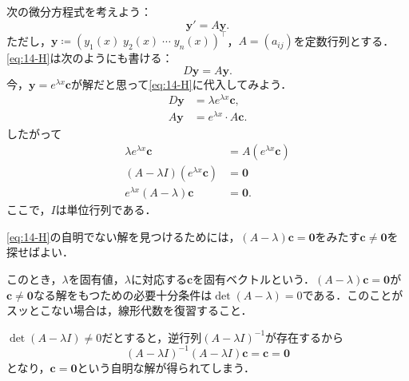 次の微分方程式を考えよう：
\begin{equation}
    \bm{y}' = A\bm{y}. \label{eq:14-H}
\end{equation}
ただし，$\bm{y} \coloneqq (y_1(x) \; y_2(x) \; \cdots \; y_n(x))^\top$，$A=(a_{ij})$を定数行列とする．\eqref{eq:14-H}は次のようにも書ける：
\begin{equation}
    D\bm{y} = A\bm{y}.
\end{equation}
今，$\bm{y}=e^{\lambda x}\bm{c}$が解だと思って\eqref{eq:14-H}に代入してみよう．
\begin{align*}
    D\bm{y} &= \lambda e^{\lambda x} \bm{c}, \\
    A\bm{y} &= e^{\lambda x} \cdot A\bm{c}.
\end{align*}
したがって
\begin{align*}
    \lambda e^{\lambda x} \bm{c} &= A(e^{\lambda x} \bm{c}) \\
    (A-\lambda I)(e^{\lambda x}\bm{c}) &= \bm{0} \\
    e^{\lambda x}(A-\lambda)\bm{c} &= \bm{0}.
\end{align*}
ここで，$I$は単位行列である．
\begin{remark}
    \eqref{eq:14-H}の自明でない解を見つけるためには，$(A-\lambda)\bm{c} = \bm{0}$をみたす$\bm{c} \neq \bm{0}$を探せばよい．
\end{remark}
このとき，$\lambda$を固有値，$\lambda$に対応する$\bm{c}$を固有ベクトルという．$(A-\lambda)\bm{c} = \bm{0}$が$\bm{c} \neq \bm{0}$なる解をもつための必要十分条件は$\det (A-\lambda) = 0$である．このことがスッとこない場合は，線形代数を復習すること．
\begin{note*}
    $\det (A-\lambda I) \neq 0$だとすると，逆行列$(A-\lambda I)^{-1}$が存在するから
    \[ (A-\lambda I)^{-1} (A-\lambda I) \bm{c} = \bm{c} = \bm{0}\]
    となり，$\bm{c} = \bm{0}$という自明な解が得られてしまう．
\end{note*}

